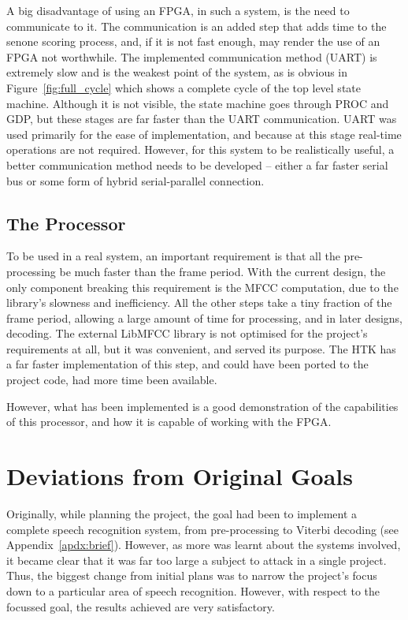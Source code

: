 		A big disadvantage of using an FPGA, in such a system, is the need to communicate to it.  The communication is an added step that adds time to the senone scoring process, and, if it is not fast enough, may render the use of an FPGA not worthwhile.  The implemented communication method (UART) is extremely slow and is the weakest point of the system, as is obvious in Figure~\ref{fig:full_cycle} which shows a complete cycle of the top level state machine.  Although it is not visible, the state machine goes through PROC and GDP, but these stages are far faster than the UART communication.  UART was used primarily for the ease of implementation, and because at this stage real-time operations are not required.  However, for this system to be realistically useful, a better communication method needs to be developed -- either a far faster serial bus or some form of hybrid serial-parallel connection.



	\subsection{The Processor} %
	\label{sub:analysis_the_processor}
		To be used in a real system, an important requirement is that all the pre-processing be much faster than the frame period.  With the current design, the only component breaking this requirement is the MFCC computation, due to the library's slowness and inefficiency.  All the other steps take a tiny fraction of the frame period, allowing a large amount of time for processing, and in later designs, decoding.  The external LibMFCC library is not optimised for the project's requirements at all, but it was convenient, and served its purpose.  The HTK has a far faster implementation of this step, and could have been ported to the project code, had more time been available.

		However, what has been implemented is a good demonstration of the capabilities of this processor, and how it is capable of working with the FPGA.


\section{Deviations from Original Goals} %
\label{sec:deviations_from_original_goals}
	Originally, while planning the project, the goal had been to implement a complete speech recognition system, from pre-processing to Viterbi decoding (see Appendix~\ref{apdx:brief}).  However, as more was learnt about the systems involved, it became clear that it was far too large a subject to attack in a single project.  Thus, the biggest change from initial plans was to narrow the project's focus down to a particular area of speech recognition.  However, with respect to the focussed goal, the results achieved are very satisfactory.

